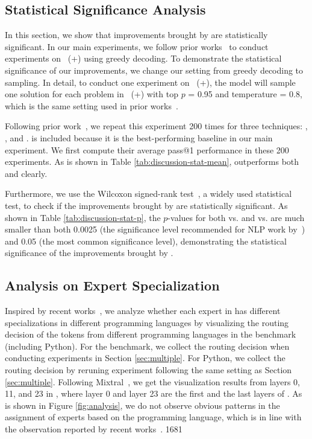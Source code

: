 \subsection{Statistical Significance Analysis}\label{sec:statistic}



In this section, we show that improvements brought by \ours are statistically significant. In our main experiments, we follow prior works~\cite{wei2023magicoder, lozhkov2024starcoder} to conduct experiments on \humaneval{}~(+) using greedy decoding. To demonstrate the statistical significance of our improvements, we change our setting from greedy decoding to sampling. In detail, to conduct one experiment on \humaneval{}~(+), the model will sample one solution for each problem in \humaneval{}~(+) with top $p$ = 0.95 and temperature = 0.8, which is the same setting used in prior works~\cite{evalplus, chen2021evaluating}.

Following prior work~\cite{evalplus}, we repeat this experiment 200 times for three techniques: \oursmerge, \ewads, and \baselineds. \ewads is included because it is the best-performing baseline in our main experiment. We first compute their average pass@1 performance in these 200 experiments. As is shown in Table \ref{tab:discussion-stat-mean}, \oursmerge outperforms both \ewads and \baselineds clearly.

Furthermore, we use the Wilcoxon signed-rank test~\cite{Wilcoxon1945IndividualCB, dror-etal-2018-hitchhikers}, a widely used statistical test, to check if the improvements brought by \ours are statistically significant. As shown in Table \ref{tab:discussion-stat-p}, the $p$-values for both \oursmerge vs. \ewads and \oursmerge vs. \baselineds are much smaller than both 0.0025 (the significance level recommended for NLP work by~\cite{sogaard-etal-2014-whats}) and 0.05 (the most common significance level), demonstrating the statistical significance of the improvements brought by \ours.

\subsection{Analysis on Expert Specialization}\label{sec:expert_analysis}

Inspired by recent works~\cite{jiang2024mixtral, xue2024openmoe}, we analyze whether each expert in \oursmoe has different specializations in different programming languages
by visualizing the routing decision of the tokens from different programming languages in the \multiple benchmark (including Python). For the \multiple benchmark, we collect the routing decision when conducting experiments in Section \ref{sec:multiple}. For Python, we collect the routing decision by reruning \humaneval experiment following the same setting as Section \ref{sec:multiple}. Following Mixtral~\cite{jiang2024mixtral}, we get the visualization results from layers 0, 11, and 23 in \oursmoe, where layer 0 and layer 23 are the first and the last layers of \oursmoe. As is shown in Figure \ref{fig:analysis}, we do not observe obvious
patterns in the assignment of experts based on the programming language, which is in line with the observation reported by recent works~\cite{jiang2024mixtral, xue2024openmoe}. 
1681
